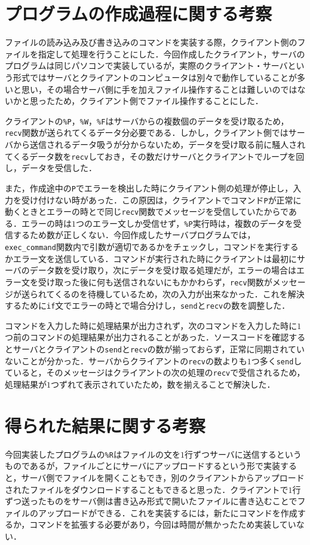 \documentclass{jarticle}[11pt]
\begin{document}
    \section{プログラムの作成過程に関する考察}
    ファイルの読み込み及び書き込みのコマンドを実装する際，クライアント側のファイルを指定して処理を行うことにした．今回作成したクライアント，サーバのプログラムは同じパソコンで実装しているが，実際のクライアント・サーバという形式ではサーバとクライアントのコンピュータは別々で動作していることが多いと思い，その場合サーバ側に手を加えファイル操作することは難しいのではないかと思ったため，クライアント側でファイル操作することにした．

    クライアントの\verb|%P|，\verb|%W|，\verb|%F|はサーバからの複数個のデータを受け取るため，\verb|recv|関数が送られてくるデータ分必要である．しかし，クライアント側ではサーバから送信されるデータ吸うが分からないため，データを受け取る前に騒人されてくるデータ数を\verb|recv|しておき，その数だけサーバとクライアントでループを回し，データを受信した．

    また，作成途中の\verb|P|でエラーを検出した時にクライアント側の処理が停止し，入力を受け付けない時があった．この原因は，クライアントでコマンド\verb|P|が正常に動くときとエラーの時とで同じ\verb|recv|関数でメッセージを受信していたからである．エラーの時は$1$つのエラー文しか受信せず，\verb|%P|実行時は，複数のデータを受信するため数が正しくない．今回作成したサーバプログラムでは，\verb|exec_command|関数内で引数が適切であるかをチェックし，コマンドを実行するかエラー文を送信している．コマンドが実行された時にクライアントは最初にサーバのデータ数を受け取り，次にデータを受け取る処理だが，エラーの場合はエラー文を受け取った後に何も送信されないにもかかわらず，\verb|recv|関数がメッセージが送られてくるのを待機しているため，次の入力が出来なかった．これを解決するために\verb|if|文でエラーの時とで場合分けし，\verb|send|と\verb|recv|の数を調整した．

    コマンドを入力した時に処理結果が出力されず，次のコマンドを入力した時に$1$つ前のコマンドの処理結果が出力されることがあった．ソースコードを確認するとサーバとクライアントの\verb|send|と\verb|recv|の数が揃っておらず，正常に同期されていないことが分かった．サーバからクライアントの\verb|recv|の数よりも$1$つ多く\verb|send|していると，そのメッセージはクライアントの次の処理の\verb|recv|で受信されるため，処理結果が$1$つずれて表示されていたため，数を揃えることで解決した．


 \section{得られた結果に関する考察}
今回実装したプログラムの\verb|%R|はファイルの文を$1$行ずつサーバに送信するというものであるが，ファイルごとにサーバにアップロードするという形で実装すると，サーバ側でファイルを開くこともでき，別のクライアントからアップロードされたファイルをダウンロードすることもできると思った．クライアントで$1$行ずつ送ったものをサーバ側は書き込み形式で開いたファイルに書き込むことでファイルのアップロードができる．これを実装するには，新たにコマンドを作成するか，コマンドを拡張する必要があり，今回は時間が無かったため実装していない．
\end{document}
